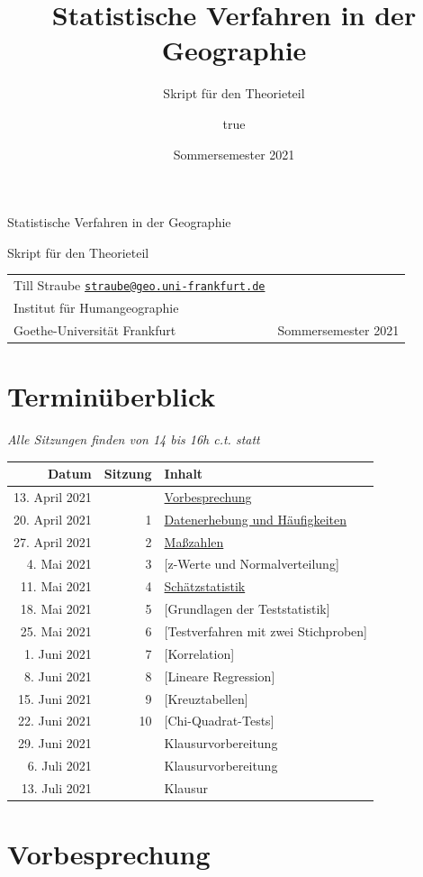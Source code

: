 \documentclass[
  11pt,
  ngerman,
  a4paper,
]{report}
\title{Statistische Verfahren in der Geographie}
\subtitle{Skript für den Theorieteil}
\author{true}
\date{Sommersemester 2021}
\makeatletter
\renewcommand{\maketitle}{
  \newpage
  \begingroup
    \setlength{\parindent}{0pt}
    \setlength{\parskip}{8pt}
    {\fontseries{b}\selectfont\Huge\raggedright{Statistische Verfahren in der Geographie}\par}
    {\fontseries{l}\LARGE\raggedright{Skript für den Theorieteil}\par}

    \vspace{1cm}
    
    \begin{tabularx}{\textwidth}{@{}X r}
                  Till Straube
        \newline \href{mailto:straube@geo.uni-frankfurt.de}{\nolinkurl{straube@geo.uni-frankfurt.de}}
                  \medskip\newline
          {\renewcommand\\{\newline}Institut für Humangeographie\\
Goethe-Universität Frankfurt}
         &
                    Sommersemester 2021
        \end{tabularx}
  \endgroup
  \vspace{1cm}
  \thispagestyle{plain}%
}
\makeatother
\begin{document}
\maketitle

{
\setcounter{tocdepth}{1}
\tableofcontents
}
\hypertarget{terminuxfcberblick}{%
\chapter*{Terminüberblick}\label{terminuxfcberblick}}

\emph{Alle Sitzungen finden von 14 bis 16h c.t. statt}

\begin{longtable}[]{@{}rrl@{}}
\toprule
Datum & Sitzung & Inhalt \\
\midrule
\endhead
13. April 2021 & & \protect\hyperlink{vorbesprechung}{Vorbesprechung} \\
20. April 2021 & 1 & \protect\hyperlink{datenerhebung-und-huxe4ufigkeiten}{Datenerhebung und Häufigkeiten} \\
27. April 2021 & 2 & \protect\hyperlink{mauxdfzahlen}{Maßzahlen} \\
4. Mai 2021 & 3 & {[}z-Werte und Normalverteilung{]} \\
11. Mai 2021 & 4 & \protect\hyperlink{schuxe4tzstatistik}{Schätzstatistik} \\
18. Mai 2021 & 5 & {[}Grundlagen der Teststatistik{]} \\
25. Mai 2021 & 6 & {[}Testverfahren mit zwei Stichproben{]} \\
1. Juni 2021 & 7 & {[}Korrelation{]} \\
8. Juni 2021 & 8 & {[}Lineare Regression{]} \\
15. Juni 2021 & 9 & {[}Kreuztabellen{]} \\
22. Juni 2021 & 10 & {[}Chi-Quadrat-Tests{]} \\
29. Juni 2021 & & Klausurvorbereitung \\
6. Juli 2021 & & Klausurvorbereitung \\
13. Juli 2021 & & Klausur \\
\bottomrule
\end{longtable}

\hypertarget{vorbesprechung}{%
\chapter*{Vorbesprechung}\label{vorbesprechung}}
\end{document}
